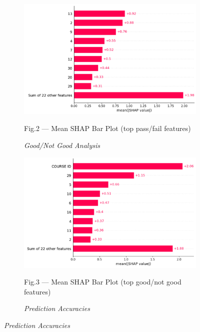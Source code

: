 \begin{figure}[H]
    \centering
    \begin{subfigure}[b]{0.45\textwidth}
        \centering
        \includegraphics[width=\textwidth]{media/ict/image18}
        \caption*{Fig.2 — Mean SHAP Bar Plot (top pass/fail features)}
        \caption*{\emph{Good/Not Good Analysis}}
    \end{subfigure}
    \hfill
    \begin{subfigure}[b]{0.45\textwidth}
        \centering
        \includegraphics[width=\textwidth]{media/ict/image19}
        \caption*{Fig.3 — Mean SHAP Bar Plot (top good/not good features)}
        \caption*{\emph{Prediction Accuracies}}
    \end{subfigure}
\end{figure}

